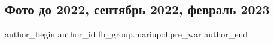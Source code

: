  
 
 
 
 

\subsection{Фото до 2022, сентябрь 2022, февраль 2023}
\label{sec:15_02_2023.fb.fb_group.mariupol.pre_war.2.foto_do_2022__sentya}

\ifcmt
 author_begin
   author_id fb_group.mariupol.pre_war
 author_end
\fi
